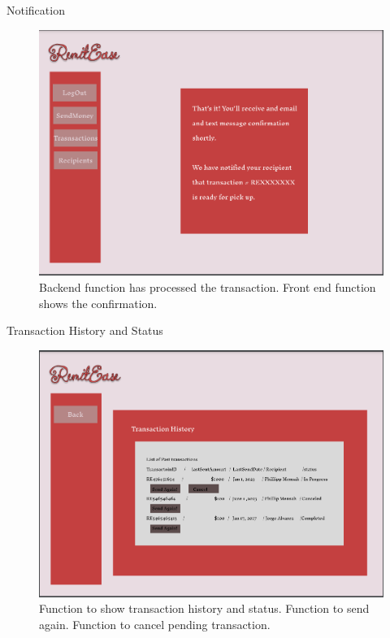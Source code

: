 \documentclass{beamer}
\begin{document}
\begin{frame}{Notification}
    \begin{figure}
        \centering
        \includegraphics[width=.7\linewidth]{MockUps/SendConfirmation.PNG}
        \caption{Backend function has processed the transaction. Front end function shows the confirmation.}
        \label{fig:enter-label}
    \end{figure}
\end{frame}

\begin{frame}{Transaction History and Status}
    \begin{figure}
        \centering
        \includegraphics[width=.7\linewidth]{MockUps/TransactionHist.PNG}
        \caption{Function to show transaction history and status. Function to send again. Function to cancel pending transaction.}
        \label{fig:enter-label}
    \end{figure}
\end{frame}
\end{document}
